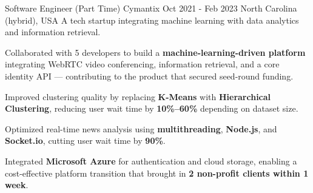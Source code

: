 \begin{cventries}

    \cventry
    {Software Engineer (Part Time)} %
    {Cymantix} %
    {Oct 2021 - Feb 2023} %
    {North Carolina (hybrid), USA} %
    {A tech startup integrating machine learning with data analytics and information retrieval.}
    {
      \begin{cvitems} %
        \item {Collaborated with 5 developers to build a \textbf{machine-learning-driven platform} integrating WebRTC video conferencing, information retrieval, and a core identity API — contributing to the product that secured seed-round funding.}
        \item {Improved clustering quality by replacing \textbf{K-Means} with \textbf{Hierarchical Clustering}, reducing user wait time by \textbf{10\%--60\%} depending on dataset size.}
        \item {Optimized real-time news analysis using \textbf{multithreading}, \textbf{Node.js}, and \textbf{Socket.io}, cutting user wait time by \textbf{90\%}.}
        \item {Integrated \textbf{Microsoft Azure} for authentication and cloud storage, enabling a cost-effective platform transition that brought in \textbf{2 non-profit clients within 1 week}.}
      \end{cvitems}
    }


\end{cventries}
